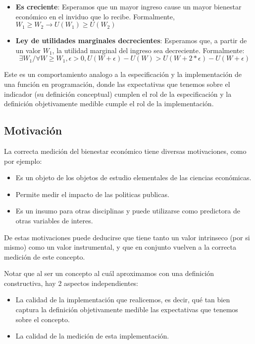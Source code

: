 \documentclass[11pt,a4paper]{tesis}
\begin{document}
\begin{itemize}
    \item \textbf{Es creciente}: Esperamos que un mayor ingreso cause un mayor bienestar económico en el inviduo que lo recibe. Formalmente, $W_1 \geq W_2 \rightarrow U(W_1) \geq U(W_2)$
    \item \textbf{Ley de utilidades marginales decrecientes}: Esperamos que, a partir de un valor $W_1$, la utilidad marginal del ingreso sea decreciente. Formalmente:
    $$
    \exists W_1 / \forall W \geq W_1, \epsilon > 0, U(W+\epsilon)-U(W) > U(W+2*\epsilon)-U(W+\epsilon)
    $$
\end{itemize}

Este es un comportamiento analogo a la especificación y la implementación de una función en programación, donde las expectativas que tenemos sobre el indicador (su definición conceptual) cumplen el rol de la especificación y la definición objetivamente medible cumple el rol de la implementación.

\subsection{Motivación}

La correcta medición del bienestar económico tiene diversas motivaciones, como por ejemplo:

\begin{itemize}
    \item Es un objeto de los objetos de estudio elementales de las ciencias económicas.
    \item Permite medir el impacto de las politicas publicas.
    \item Es un insumo para otras disciplinas y puede utilizarse como predictora de otras variables de interes.
\end{itemize}

De estas motivaciones puede deducirse que tiene tanto un valor intrinseco (por si mismo) como un valor instrumental, y que en conjunto vuelven a la correcta medición de este concepto.

Notar que al ser un concepto al cuál aproximamos con una definición constructiva, hay 2 aspectos independientes:

\begin{itemize}
    \item La calidad de la implementación que realicemos, es decir, qué tan bien captura la definición objetivamente medible las expectativas que tenemos sobre el concepto.
    \item La calidad de la medición de esta implementación.
\end{itemize}
\end{document}
